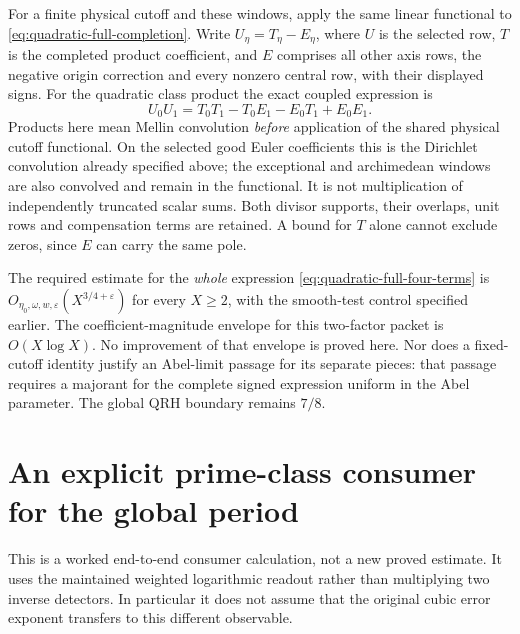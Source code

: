 \documentclass[11pt]{article}
\newcommand{\eps}{\varepsilon}
\begin{document}
For a finite physical cutoff and these windows, apply the same
linear functional to \eqref{eq:quadratic-full-completion}.
Write $U_\eta=T_\eta-E_\eta$, where $U$ is the selected row,
$T$ is the completed product coefficient, and $E$ comprises
all other axis rows, the negative origin correction and
every nonzero central row, with their displayed signs.
For the quadratic class product the exact coupled expression is
\begin{equation}\label{eq:quadratic-full-four-terms}
 U_0U_1=T_0T_1-T_0E_1-E_0T_1+E_0E_1.
\end{equation}
Products here mean Mellin convolution \emph{before} application
of the shared physical cutoff functional. On the selected good
Euler coefficients this is the Dirichlet convolution already
specified above; the exceptional and archimedean windows are
also convolved and remain in the functional. It is not multiplication
of independently truncated scalar sums.
Both divisor supports, their overlaps, unit rows and compensation
terms are retained. A bound for $T$ alone cannot exclude zeros,
since $E$ can carry the same pole.

The required estimate for the \emph{whole} expression
\eqref{eq:quadratic-full-four-terms} is
$O_{\eta_0,\omega,w,\eps}(X^{3/4+\eps})$ for every $X\ge2$,
with the smooth-test control specified earlier.
The coefficient-magnitude envelope for this two-factor packet
is $O(X\log X)$. No improvement of that envelope is proved here.
Nor does a fixed-cutoff identity justify an Abel-limit passage
for its separate pieces: that passage requires a majorant for
the complete signed expression uniform in the Abel parameter.
The global QRH boundary remains $7/8$.

\section{An explicit prime-class consumer for the global period}
\label{sec:quartic-prime-class-consumer}

This is a worked end-to-end consumer calculation, not a new proved
estimate. It uses the maintained weighted logarithmic readout rather
than multiplying two inverse detectors. In particular it does not
assume that the original cubic error exponent transfers to this
different observable.
\end{document}
